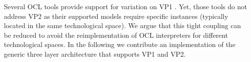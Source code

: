 Several OCL tools provide
support for variation on VP1
\cite{WWW:MDT,akehurst2003ocl,WWW:dresdenOCL,kolovos2008detecting}. 
Yet, those tools do not address VP2 as their supported models require specific 
instances (typically located in the same technological space).
We argue that this tight coupling can be reduced to avoid the
reimplementation of OCL interpreters for different technological spaces.
In the following we contribute an implementation of the generic three layer
architecture that supports VP1 and VP2.

	
	
	
	

%
%	
